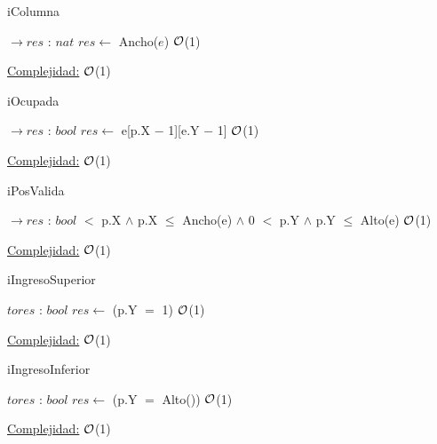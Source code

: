 \begin{Representacion}
\begin{Algoritmos}
	
	\begin{algorithm}[H]
		\caption{iColumna}
		\begin{algorithmic}[1]
			 $\to res$ : $nat$
				\State $res \gets$ Ancho($e$) \Comment $\mathcal{O}$(1)
			\EndProcedure		
		\end{algorithmic}
		\underline{Complejidad:} $\mathcal{O}$(1)
	\end{algorithm}
	
	\begin{algorithm}
		\caption{iOcupada}
		\begin{algorithmic}[1]
			 $\to res$ : $bool$	
				\State $res \gets$ e[p.X $-$ 1][e.Y $-$ 1] \Comment $\mathcal{O}$(1)
			\EndProcedure		
		\end{algorithmic}
		\underline{Complejidad:} $\mathcal{O}$(1)
	\end{algorithm}
	
	\begin{algorithm}
		\caption{iPosValida}
		\begin{algorithmic}
			 $\to res$ : $bool$
				 $<$ p.X $\land$ p.X $\leq$ Ancho(e) $\land$ 0 $<$ p.Y $\land$ p.Y $\leq$ Alto(e) \Comment $\mathcal{O}$(1)
			\EndProcedure		
		\end{algorithmic}
		\underline{Complejidad:} $\mathcal{O}$(1)
	\end{algorithm}

	\begin{algorithm}[H]
		\caption{iIngresoSuperior}
		\begin{algorithmic}[1]
			 $to res$ : $bool$
				\State $res \gets$ (p.Y $=$ 1) \Comment $\mathcal{O}$(1)		
			\EndProcedure		
		\end{algorithmic}
		\underline{Complejidad:} $\mathcal{O}$(1)
	\end{algorithm}
	
	\begin{algorithm}[H]
		\caption{iIngresoInferior}
		\begin{algorithmic}[1]
			 $to res$ : $bool$
				\State $res \gets$ (p.Y $=$ Alto()) \Comment $\mathcal{O}$(1)		
			\EndProcedure		
		\end{algorithmic}
		\underline{Complejidad:} $\mathcal{O}$(1)
	\end{algorithm}
	

\end{Algoritmos}
\end{Representacion}

